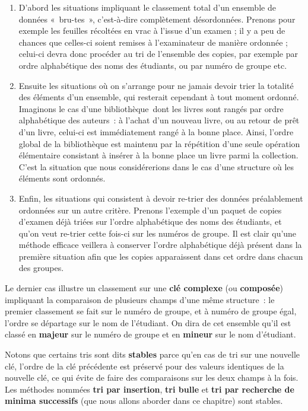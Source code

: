 	\liststyleWWviiiNumi
	\begin{enumerate}
		\item 
			D’abord les situations impliquant le classement total d’un ensemble de
			données «~bru-tes~», c’est-à-dire complètement désordonnées. Prenons
			pour exemple les feuilles récoltées en vrac à l’issue d’un examen ; il
			y a peu de chances que celles-ci soient remises à l’examinateur de
			manière ordonnée ; celui-ci devra donc procéder au tri de l’ensemble
			des copies, par exemple par ordre alphabétique des noms des étudiants,
			ou par numéro de groupe etc.
		\item 
			Ensuite les situations où on s’arrange pour ne jamais devoir trier la
			totalité des éléments d’un ensemble, qui resterait cependant à tout
			moment ordonné. Imaginons le cas d’une bibliothèque~dont les livres
			sont rangés par ordre alphabétique des auteurs~: à l’achat d’un nouveau
			livre, ou au retour de prêt d’un livre, celui-ci est immédiatement
			rangé à la bonne place. Ainsi, l’ordre global de la bibliothèque est
			maintenu par la répétition d’une seule opération élémentaire consistant
			à insérer à la bonne place un livre parmi la collection. C’est la
			situation que nous considérerions dans le cas d'une structure
			où les éléments sont ordonnés.
		\item 
			Enfin, les situations qui consistent à devoir re-trier des données
			préalablement ordonnées sur un autre critère. Prenons l’exemple d’un
			paquet de copies d’examen déjà triées sur l’ordre alphabétique des noms
			des étudiants, et qu’on veut re-trier cette fois-ci sur les numéros de
			groupe. Il est clair qu’une méthode efficace veillera à conserver
			l’ordre alphabétique déjà présent dans la première situation afin que
			les copies apparaissent dans cet ordre dans chacun des groupes.
	\end{enumerate}
	
	Le dernier cas illustre un classement sur une \textbf{clé complexe}
	(ou \textbf{composée}) impliquant la comparaison de plusieurs champs
	d’une même structure~: le premier classement se fait sur le numéro de
	groupe, et à numéro de groupe égal, l’ordre se départage sur le nom de
	l’étudiant. On dira de cet ensemble qu’il est classé en \textbf{majeur}
	sur le numéro de groupe et en \textbf{mineur} sur le nom d’étudiant.

	Notons que certains tris sont dits \textbf{stables} parce
	qu'en cas de tri sur une nouvelle clé, l’ordre de la
	clé précédente est préservé pour des valeurs identiques de la nouvelle
	clé, ce qui évite de faire des comparaisons sur les deux champs à la
	fois. Les méthodes nommées \textbf{tri par insertion}, \textbf{tri
	bulle} et \textbf{tri par recherche de minima successifs }(que nous
	allons aborder dans ce chapitre) sont stables.

